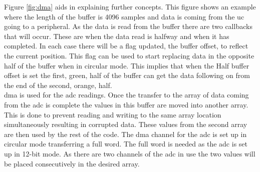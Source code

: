 \documentclass[12pt,a4paper]{report}
\begin{document}
Figure \ref{fig:dma} aids in explaining further concepts. This figure shows an example where the length of the buffer is 4096 samples and data is coming from the \ac{uc} going to a peripheral. As the data is read from the buffer there are two callbacks that will occur. These are when the data read is halfway and when it has completed. In each case there will be a flag updated, the buffer offset, to reflect the current position. This flag can be used to start replacing data in the opposite half of the buffer when in circular mode. This implies that when the Half buffer offset is set the first, green, half of the buffer can get the data following on from the end of the second, orange, half. \\
\ac{dma} is used for the \ac{adc} readings. Once the transfer to the array of data coming from the \ac{adc} is complete the values in this buffer are moved into another array. This is done to prevent reading and writing to the same array location simultaneously resulting in corrupted data. These values from the second array are then used by the rest of the code. The \ac{dma} channel for the \ac{adc} is set up in circular mode transferring a full word. The full word is needed as the \ac{adc} is set up in 12-bit mode. As there are two channels of the \ac{adc} in use the two values will be placed consecutively in the desired array.
\end{document}
